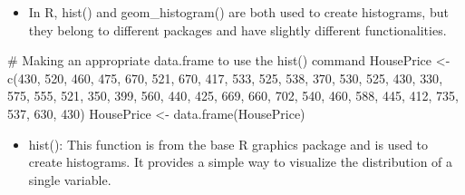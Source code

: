 \documentclass[
  letterpaper,
  DIV=11,
  numbers=noendperiod]{scrreprt}
\newenvironment{Shaded}{\begin{snugshade}}{\end{snugshade}}
\newcommand{\AttributeTok}[1]{\textcolor[rgb]{0.40,0.45,0.13}{#1}}
\newcommand{\CommentTok}[1]{\textcolor[rgb]{0.37,0.37,0.37}{#1}}
\newcommand{\DecValTok}[1]{\textcolor[rgb]{0.68,0.00,0.00}{#1}}
\newcommand{\FunctionTok}[1]{\textcolor[rgb]{0.28,0.35,0.67}{#1}}
\newcommand{\NormalTok}[1]{\textcolor[rgb]{0.00,0.23,0.31}{#1}}
\newcommand{\OtherTok}[1]{\textcolor[rgb]{0.00,0.23,0.31}{#1}}
\newcommand{\SpecialCharTok}[1]{\textcolor[rgb]{0.37,0.37,0.37}{#1}}
\newcommand{\StringTok}[1]{\textcolor[rgb]{0.13,0.47,0.30}{#1}}
\providecommand{\tightlist}{%
  \setlength{\itemsep}{0pt}\setlength{\parskip}{0pt}}\usepackage{longtable,booktabs,array}
\begin{document}
\begin{itemize}
\tightlist
\item
  In R, hist() and geom\_histogram() are both used to create histograms,
  but they belong to different packages and have slightly different
  functionalities.
\end{itemize}

\begin{Shaded}
\begin{Highlighting}[]
\CommentTok{\# Making an appropriate data.frame to use the hist() command}
\NormalTok{HousePrice }\OtherTok{\textless{}{-}} \FunctionTok{c}\NormalTok{(}\DecValTok{430}\NormalTok{, }\DecValTok{520}\NormalTok{, }\DecValTok{460}\NormalTok{, }\DecValTok{475}\NormalTok{, }\DecValTok{670}\NormalTok{, }\DecValTok{521}\NormalTok{, }\DecValTok{670}\NormalTok{, }\DecValTok{417}\NormalTok{, }\DecValTok{533}\NormalTok{, }\DecValTok{525}\NormalTok{, }\DecValTok{538}\NormalTok{,}
    \DecValTok{370}\NormalTok{, }\DecValTok{530}\NormalTok{, }\DecValTok{525}\NormalTok{, }\DecValTok{430}\NormalTok{, }\DecValTok{330}\NormalTok{, }\DecValTok{575}\NormalTok{, }\DecValTok{555}\NormalTok{, }\DecValTok{521}\NormalTok{, }\DecValTok{350}\NormalTok{, }\DecValTok{399}\NormalTok{, }\DecValTok{560}\NormalTok{, }\DecValTok{440}\NormalTok{, }\DecValTok{425}\NormalTok{, }\DecValTok{669}\NormalTok{,}
    \DecValTok{660}\NormalTok{, }\DecValTok{702}\NormalTok{, }\DecValTok{540}\NormalTok{, }\DecValTok{460}\NormalTok{, }\DecValTok{588}\NormalTok{, }\DecValTok{445}\NormalTok{, }\DecValTok{412}\NormalTok{, }\DecValTok{735}\NormalTok{, }\DecValTok{537}\NormalTok{, }\DecValTok{630}\NormalTok{, }\DecValTok{430}\NormalTok{)}
\NormalTok{HousePrice }\OtherTok{\textless{}{-}} \FunctionTok{data.frame}\NormalTok{(HousePrice)}
\end{Highlighting}
\end{Shaded}

\begin{itemize}
\tightlist
\item
  hist(): This function is from the base R graphics package and is used
  to create histograms. It provides a simple way to visualize the
  distribution of a single variable.
\end{itemize}

\begin{Shaded}
\end{Shaded}
\end{document}
